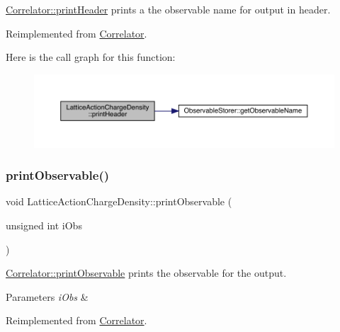 \mbox{\hyperlink{class_correlator_ac7c5a07d7cbee97c417a1659b93083b2}{Correlator\+::print\+Header}} prints a the observable name for output in header. 



Reimplemented from \mbox{\hyperlink{class_correlator_ac7c5a07d7cbee97c417a1659b93083b2}{Correlator}}.

Here is the call graph for this function\+:
\nopagebreak
\begin{figure}[H]
\begin{center}
\leavevmode
\includegraphics[width=350pt]{class_lattice_action_charge_density_a2a7a806862f23975161316a37f47f22e_cgraph}
\end{center}
\end{figure}
\mbox{\label{class_lattice_action_charge_density_abb7db718d4069faab0ed19f31aa85ad4}} 
\subsubsection{\texorpdfstring{printObservable()}{printObservable()}}
{\footnotesize\ttfamily void Lattice\+Action\+Charge\+Density\+::print\+Observable (\begin{DoxyParamCaption}\item[{unsigned int}]{i\+Obs }\end{DoxyParamCaption})\hspace{0.3cm}{\ttfamily [virtual]}}



\mbox{\hyperlink{class_correlator_a15744ddb9f2b71fff34ac762d101df38}{Correlator\+::print\+Observable}} prints the observable for the output. 


\begin{DoxyParams}{Parameters}
{\em i\+Obs} & \\
\hline
\end{DoxyParams}


Reimplemented from \mbox{\hyperlink{class_correlator_a15744ddb9f2b71fff34ac762d101df38}{Correlator}}.

